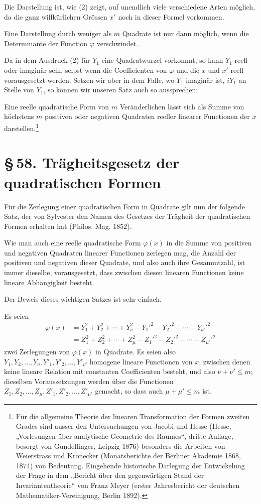 \documentclass[11pt]{article}
\newcommand{\sect}[2]{\section*{\S\,#1. #2}}
\begin{document}
Die Darstellung ist, wie (2) zeigt, auf unendlich viele verschiedene Arten möglich, da die ganz willkürlichen Grössen $x'$ noch in dieser Formel vorkommen.

Eine Darstellung durch weniger als $m$ Quadrate ist nur dann möglich, wenn die Determinante der Function $\varphi$ verschwindet.

Da in dem Ausdruck (2) für $Y_1$ eine Quadratwurzel vorkommt, so kann $Y_1$ reell oder imaginär sein, selbst wenn die Coefficienten von $\varphi$ und die $x$ und $x'$ reell vorausgesetzt werden. Setzen wir aber in dem Falle, wo $Y_1$ imaginär ist, $iY_1$ an Stelle von $Y_1$, so können wir unseren Satz auch so aussprechen:

Eine reelle quadratische Form von $m$ Veränderlichen lässt sich als Summe von höchstens $m$ positiven oder negativen Quadraten reeller linearer Functionen der $x$ darstellen.\footnote{Für die allgemeine Theorie der linearen Transformation der Formen zweiten Grades sind ausser den Untersuchungen von Jacobi und Hesse (Hesse, „Vorlesungen über analytische Geometrie des Raumes“, dritte Auflage, besorgt von Gundelfinger, Leipzig 1876) besonders die Arbeiten von Weierstrass und Kronecker (Monatsberichte der Berliner Akademie 1868, 1874) von Bedeutung. Eingehende historische Darlegung der Entwickelung der Frage in dem „Bericht über den gegenwärtigen Stand der Invariantentheorie“ von Franz Meyer (erster Jahresbericht der deutschen Mathematiker-Vereinigung, Berlin 1892).}

\sect{58}{Trägheitsgesetz der quadratischen Formen}

Für die Zerlegung einer quadratischen Form in Quadrate gilt nun der folgende Satz, der von Sylvester den Namen des Gesetzes der Trägheit der quadratischen Formen erhalten hat (Philos. Mag. 1852).

Wie man auch eine reelle quadratische Form $\varphi(x)$ in die Summe von positiven und negativen Quadraten linearer Functionen zerlegen mag, die Anzahl der positiven und negativen dieser Quadrate, und also auch ihre Gesammtzahl, ist immer dieselbe, vorausgesetzt, dass zwischen diesen linearen Functionen keine lineare Abhängigkeit besteht.

Der Beweis dieses wichtigen Satzes ist sehr einfach.

Es seien
\begin{equation}
\begin{aligned}
 \varphi(x)&=Y_1^2+Y_2^2+\cdots+Y_\nu^2-Y_1'^2-Y_2'^2-\cdots-Y_{\nu'}'^2\\
 &=Z_1^2+Z_2^2+\cdots+Z_\mu^2-Z_1'^2-Z_2'^2-\cdots-Z_{\mu'}'^2
\end{aligned}
\tag{1}
\end{equation}
zwei Zerlegungen von $\varphi(x)$ in Quadrate. Es seien also $Y_1,Y_2,\ldots,Y_\nu,Y'_1,Y'_2,\ldots,Y'_{\nu'}$ homogene lineare Functionen von $x$, zwischen denen keine lineare Relation mit constanten Coefficienten besteht, und also $\nu+\nu'\leq m$; dieselben Voraussetzungen werden über die Functionen $Z_1,Z_2,\ldots,Z_\mu,Z'_1,Z'_2,\ldots,Z'_{\mu'}$ gemacht, so dass auch $\mu+\mu'\leq m$ ist.
\end{document}
